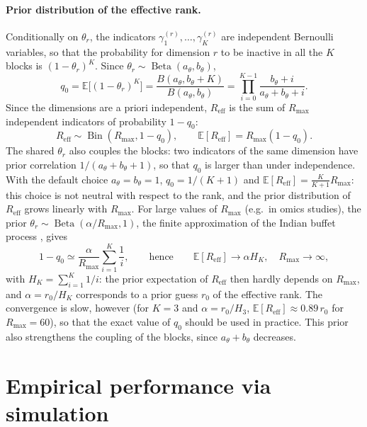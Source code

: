 \documentclass[11pt]{article}
\DeclareMathOperator{\Be}{Beta}
\begin{document}
\paragraph{Prior distribution of the effective rank.} Conditionally on $\theta_r$, the indicators $\gamma_1^{(r)},\ldots,\gamma_K^{(r)}$ are independent Bernoulli variables, so that the probability for dimension $r$ to be inactive in all the $K$ blocks is $(1-\theta_r)^K$. Since $\theta_r\sim \Be(a_\theta,b_\theta)$,
\[
  q_0=\mathbb E\bigl[(1-\theta_r)^K\bigr]=\frac{B(a_\theta,b_\theta+K)}{B(a_\theta,b_\theta)}=\prod_{i=0}^{K-1}\frac{b_\theta+i}{a_\theta+b_\theta+i}.
\]
Since the dimensions are a priori independent, $R_{\mathrm{eff}}$ is the sum of $R_{\max}$ independent indicators of probability $1-q_0$:
\[
  R_{\mathrm{eff}}\sim \operatorname{Bin}(R_{\max},1-q_0), \qquad \mathbb E[R_{\mathrm{eff}}]=R_{\max}(1-q_0).
\]
The shared $\theta_r$ also couples the blocks: two indicators of the same dimension have prior correlation $1/(a_\theta+b_\theta+1)$, so that $q_0$ is larger than under independence. With the default choice $a_\theta=b_\theta=1$, $q_0=1/(K+1)$ and $\mathbb E[R_{\mathrm{eff}}]=\frac{K}{K+1}R_{\max}$: this choice is not neutral with respect to the rank, and the prior distribution of $R_{\mathrm{eff}}$ grows linearly with $R_{\max}$. For large values of $R_{\max}$ (e.g.\ in omics studies), the prior $\theta_r\sim \Be(\alpha/R_{\max},1)$, the finite approximation of the Indian buffet process \citep{griffiths2011}, gives
\[
  1-q_0 \simeq \frac{\alpha}{R_{\max}} \sum_{i=1}^K \frac1{i}, \qquad\text{hence}\qquad \mathbb E[R_{\mathrm{eff}}]\longrightarrow\alpha H_K,\quad R_{\max}\to\infty,
\]
with $H_K=\sum_{i=1}^K1/i$: the prior expectation of $R_{\mathrm{eff}}$ then hardly depends on $R_{\max}$, and $\alpha=r_0/H_K$ corresponds to a prior guess $r_0$ of the effective rank. The convergence is slow, however (for $K=3$ and $\alpha=r_0/H_3$, $\mathbb E[R_{\mathrm{eff}}]\approx0.89\,r_0$ for $R_{\max}=60$), so that the exact value of $q_0$ should be used in practice. This prior also strengthens the coupling of the blocks, since $a_\theta+b_\theta$ decreases.



\section{Empirical performance via simulation}
\end{document}
